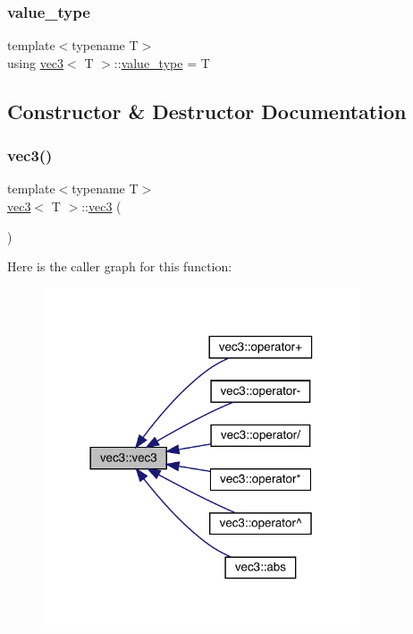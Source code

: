 \subsubsection{\texorpdfstring{value\+\_\+type}{value\_type}}
{\footnotesize\ttfamily template$<$typename T$>$ \\
using \mbox{\hyperlink{structvec3}{vec3}}$<$ T $>$\+::\mbox{\hyperlink{structvec3_a20de853e5a37c5197acba3e136a66735}{value\+\_\+type}} =  T}



\subsection{Constructor \& Destructor Documentation}
\mbox{\label{structvec3_afb7342872bc442bf0da6a7da1671e77e}} 
\subsubsection{\texorpdfstring{vec3()}{vec3()}\hspace{0.1cm}{\footnotesize\ttfamily [1/3]}}
{\footnotesize\ttfamily template$<$typename T$>$ \\
\mbox{\hyperlink{structvec3}{vec3}}$<$ T $>$\+::\mbox{\hyperlink{structvec3}{vec3}} (\begin{DoxyParamCaption}{ }\end{DoxyParamCaption})\hspace{0.3cm}{\ttfamily [inline]}}

Here is the caller graph for this function\+:\nopagebreak
\begin{figure}[H]
\begin{center}
\leavevmode
\includegraphics[width=266pt]{structvec3_afb7342872bc442bf0da6a7da1671e77e_icgraph}
\end{center}
\end{figure}
\mbox{\label{structvec3_a9cdcc79d7383d2676ae1f5701c481607}} 
